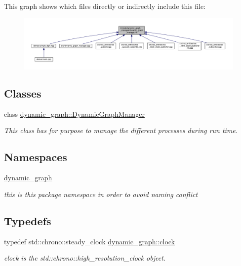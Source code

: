 This graph shows which files directly or indirectly include this file\+:
\nopagebreak
\begin{figure}[H]
\begin{center}
\leavevmode
\includegraphics[width=350pt]{dynamic__graph__manager_8hh__dep__incl}
\end{center}
\end{figure}
\subsection*{Classes}
\begin{DoxyCompactItemize}
\item 
class \hyperlink{classdynamic__graph_1_1DynamicGraphManager}{dynamic\+\_\+graph\+::\+Dynamic\+Graph\+Manager}
\begin{DoxyCompactList}\small\item\em This class has for purpose to manage the different processes during run time. \end{DoxyCompactList}\end{DoxyCompactItemize}
\subsection*{Namespaces}
\begin{DoxyCompactItemize}
\item 
 \hyperlink{namespacedynamic__graph}{dynamic\+\_\+graph}
\begin{DoxyCompactList}\small\item\em this is this package namespace in order to avoid naming conflict \end{DoxyCompactList}\end{DoxyCompactItemize}
\subsection*{Typedefs}
\begin{DoxyCompactItemize}
\item 
typedef std\+::chrono\+::steady\+\_\+clock \hyperlink{namespacedynamic__graph_aca70acb5331a18e090e49b3d85290a7e}{dynamic\+\_\+graph\+::clock}
\begin{DoxyCompactList}\small\item\em clock is the std\+::chrono\+::high\+\_\+resolution\+\_\+clock object. \end{DoxyCompactList}\end{DoxyCompactItemize}



